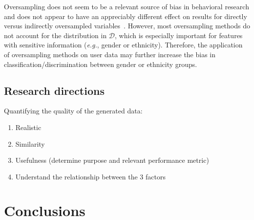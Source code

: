 \documentclass[parskip=full]{scrartcl}
\begin{document}

Oversampling does not seem to be a relevant source of bias in behavioral
research and does not appear to have an appreciably different effect on
results for directly versus indirectly oversampled
variables~\cite{hauner2014latent}. However, most oversampling methods do not
account for the distribution in $\mathcal{D}$, which is especially important
for features with sensitive information (\textit{e.g.}, gender or ethnicity).
Therefore, the application of oversampling methods on user data may further
increase the bias in classification/discrimination between gender or ethnicity
groups.


\subsection{Research directions}


Quantifying the quality of the generated data:

\begin{enumerate}
    \item Realistic
    \item Similarity
    \item Usefulness (determine purpose and relevant performance metric)
    \item Understand the relationship between the 3 factors
\end{enumerate}

\section{Conclusions}~\label{sec:conclusions}

\printbibliography
\end{document}
